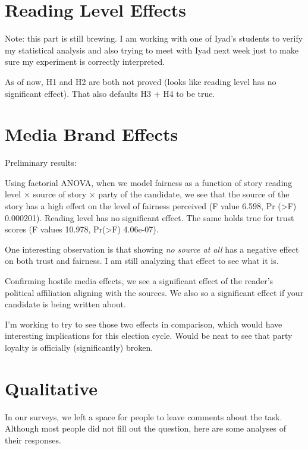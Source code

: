 
 

 
\section{Reading Level Effects}






Note: this part is still brewing. I am working with one of Iyad's students to verify my statistical analysis and also trying to meet with Iyad next week just to make sure my experiment is correctly interpreted.

As of now, H1 and H2 are both not proved (looks like reading level has no significant effect). That also defaults H3 + H4 to be true.


\section{Media Brand Effects}

Preliminary results:

Using factorial ANOVA, when we model fairness as a function of story reading level $\times$ source of story $\times$ party of the candidate, we see that the source of the story has a high effect on the level of fairness perceived (F value 6.598, Pr (>F) 0.000201). Reading level has no significant effect. The same holds true for trust scores (F values 10.978, Pr(>F) 4.06e-07).

One interesting observation is that showing \emph{no source at all} has a negative effect on both trust and fairness. I am still analyzing that effect to see what it is.
 
Confirming hostile media effects, we see a significant effect of the reader's political affiliation aligning with the sources. We also so a significant effect if your candidate is being written about. 

I'm working to try to see those two effects in comparison, which would have interesting implications for this election cycle. Would be neat to see that party loyalty is officially (significantly) broken.

\section{Qualitative}
In our surveys, we left a space for people to leave comments about the task. Although most people did not fill out the question, here are some analyses of their responses.

